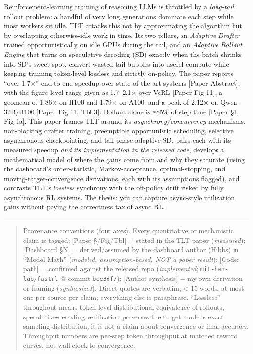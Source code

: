 \documentclass[
  11pt,
  letterpaper,
]{article}
\begin{document}
Reinforcement-learning training of reasoning LLMs is throttled by a
\emph{long-tail} rollout problem: a handful of very long generations
dominate each step while most workers sit idle. TLT attacks this not by
approximating the algorithm but by overlapping otherwise-idle work in
time. Its two pillars, an \emph{Adaptive Drafter} trained
opportunistically on idle GPUs during the tail, and an \emph{Adaptive
Rollout Engine} that turns on speculative decoding (SD) exactly when the
batch shrinks into SD's sweet spot, convert wasted tail bubbles into
useful compute while keeping training token-level lossless and strictly
on-policy. The paper reports ``over 1.7×'' end-to-end speedup over
state-of-the-art systems {[}Paper Abstract{]}, with the figure-level
range given as 1.7--2.1× over VeRL {[}Paper Fig 11{]}, a geomean of
1.86× on H100 and 1.79× on A100, and a peak of 2.12× on Qwen-32B/H100
{[}Paper Fig 11, Tbl 3{]}. Rollout alone is ≈85\% of step time {[}Paper
§1, Fig 1a{]}. This paper frames TLT around its
\emph{asynchrony/concurrency} mechanisms, non-blocking drafter training,
preemptible opportunistic scheduling, selective asynchronous
checkpointing, and tail-phase adaptive SD, pairs each with its measured
speedup \emph{and its implementation in the released code}, develops a
mathematical model of where the gains come from and why they saturate
(using the dashboard's order-statistic, Markov-acceptance,
optimal-stopping, and moving-target-convergence derivations, each with
its assumptions flagged), and contrasts TLT's \emph{lossless} synchrony
with the off-policy drift risked by fully asynchronous RL systems. The
thesis: you can capture async-style utilization gains without paying the
correctness tax of async RL.

\begin{center}\rule{0.5\linewidth}{0.5pt}\end{center}

\begin{quote}
Provenance conventions (four axes). Every quantitative or mechanistic
claim is tagged: {[}Paper §/Fig/Tbl{]} = stated in the TLT paper
(\emph{measured}); {[}Dashboard §N{]} = derived/assumed by the dashboard
author (Hibbs) in ``Model Math'' (\emph{modeled, assumption-based, NOT a
paper result}); {[}Code: path{]} = confirmed against the released repo
(\emph{implemented}; \texttt{mit-han-lab/fastrl} @ commit
\texttt{bce3df7}); {[}Author synthesis{]} = my own derivation or framing
(\emph{synthesized}). Direct quotes are verbatim, \textless{} 15 words,
at most one per source per claim; everything else is paraphrase.
``Lossless'' throughout means token-level distributional equivalence of
rollouts, speculative-decoding verification preserves the target model's
exact sampling distribution; it is not a claim about convergence or
final accuracy. Throughput numbers are per-step token throughput at
matched reward curves, not wall-clock-to-convergence.
\end{quote}
\end{document}
